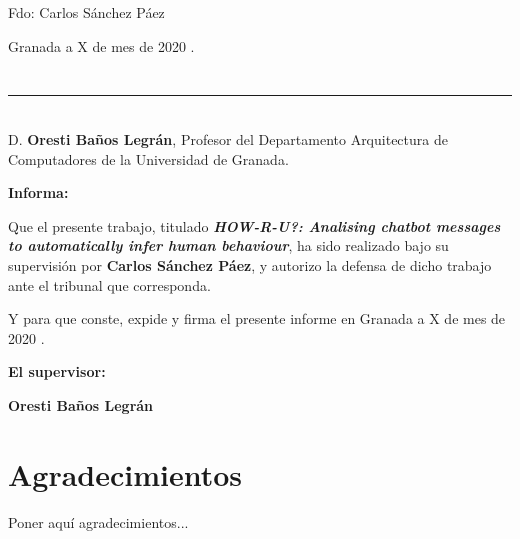 \vspace{6cm}

\begin{center}
  Fdo: Carlos Sánchez Páez

\end{center}

\vspace{2cm}

\begin{flushright}
Granada a X de mes de 2020 .
\end{flushright}

\newpage

\section*{}
\thispagestyle{empty}

\noindent\rule[-1ex]{\textwidth}{2pt}\\[4.5ex]

D. \textbf{Oresti Baños Legrán}, Profesor del Departamento Arquitectura de Computadores de la Universidad de Granada.



\vspace{0.5cm}

\textbf{Informa:}

\vspace{0.5cm}

Que el presente trabajo, titulado \textit{\textbf{HOW-R-U?: Analising chatbot messages to automatically infer human behaviour}},
ha sido realizado bajo su supervisión por \textbf{Carlos Sánchez Páez}, y autorizo la defensa de dicho trabajo ante el tribunal
que corresponda.

\vspace{0.5cm}

Y para que conste, expide y firma el presente informe en Granada a X de mes de 2020 .

\vspace{1cm}

\textbf{El supervisor:}

\vspace{5cm}
\begin{center}
\textbf{Oresti Baños Legrán}

\end{center}


\newpage

\section*{Agradecimientos}
\thispagestyle{empty}

       \vspace{1cm}


Poner aquí agradecimientos...
